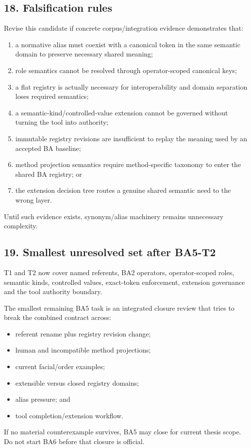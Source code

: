 \documentclass[
  10pt,
  a4paper,
]{article}
\providecommand{\tightlist}{%
  \setlength{\itemsep}{0pt}\setlength{\parskip}{0pt}}
\begin{document}
\subsection{18. Falsification rules}\label{falsification-rules}

Revise this candidate if concrete corpus/integration evidence
demonstrates that:

\begin{enumerate}
\def\labelenumi{\arabic{enumi}.}
\tightlist
\item
  a normative alias must coexist with a canonical token in the same
  semantic domain to preserve necessary shared meaning;
\item
  role semantics cannot be resolved through operator-scoped canonical
  keys;
\item
  a flat registry is actually necessary for interoperability and domain
  separation loses required semantics;
\item
  a semantic-kind/controlled-value extension cannot be governed without
  turning the tool into authority;
\item
  immutable registry revisions are insufficient to replay the meaning
  used by an accepted BA baseline;
\item
  method projection semantics require method-specific taxonomy to enter
  the shared BA registry; or
\item
  the extension decision tree routes a genuine shared semantic need to
  the wrong layer.
\end{enumerate}

Until such evidence exists, synonym/alias machinery remains unnecessary
complexity.

\subsection{19. Smallest unresolved set after
BA5-T2}\label{smallest-unresolved-set-after-ba5-t2}

T1 and T2 now cover named referents, BA2 operators, operator-scoped
roles, semantic kinds, controlled values, exact-token enforcement,
extension governance and the tool authority boundary.

The smallest remaining BA5 task is an integrated closure review that
tries to break the combined contract across:

\begin{itemize}
\tightlist
\item
  referent rename plus registry revision change;
\item
  human and incompatible method projections;
\item
  current facial/order examples;
\item
  extensible versus closed registry domains;
\item
  alias pressure; and
\item
  tool completion/extension workflow.
\end{itemize}

If no material counterexample survives, BA5 may close for current thesis
scope. Do not start BA6 before that closure is official.
\end{document}

